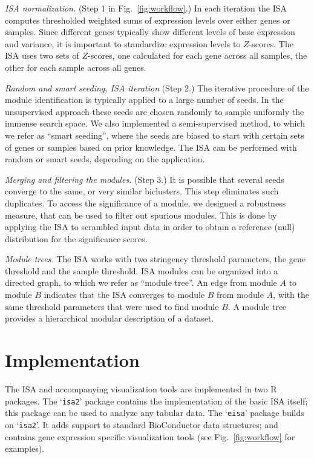 \documentclass{bioinfo}
\newcommand{\Rpackage}[1]{`\texttt{#1}'}
\begin{document}
\emph{ISA normalization.} (Step 1 in Fig.~\ref{fig:workflow}.)
In each iteration the ISA computes thresholded weighted sums of expression
levels over either genes or samples. Since different genes 
typically show different levels of base
expression and variance, it is important to standardize expression
levels to $Z$-scores. The ISA uses two sets of $Z$-scores, one
calculated for each gene across all samples, the other for each sample
across all genes.

\emph{Random and smart seeding, ISA iteration} (Step 2.)
The iterative procedure of the module identification is typically applied to a
large number of seeds. In the unsupervised approach these seeds are chosen
randomly to sample uniformly the immense search space. We also implemented a
semi-supervised method, to which we refer as ``smart seeding'', where the
seeds are biased to start with certain sets of genes or samples based on
prior knowledge. The ISA can be performed with random or smart
seeds, depending on the application.

\emph{Merging and filtering the modules.} (Step 3.)
It is possible that several seeds converge to the same, or very similar
biclusters. This step eliminates such duplicates.
To access the significance of a module, we designed a robustness
measure, that can be used to filter out spurious modules. This is done
by applying the ISA to scrambled input data in order to obtain a
reference (null) distribution for the significance scores.

\emph{Module trees.}
The ISA works with two stringency threshold parameters, the gene
threshold and the sample threshold. ISA modules can be organized into
a directed graph, to which we refer as ``module tree''. An edge from module
$A$ to module $B$ indicates that the ISA converges to module $B$ from module $A$,
with the same threshold parameters that were used to find module
$B$. A module tree provides a hierarchical modular description of a
dataset.

\section{Implementation}%
\label{sec:implementation}

The ISA and accompanying visualization tools are implemented in two R
packages. The \Rpackage{isa2} package contains the implementation of
the basic ISA itself; this package can be used to analyze any tabular
data. The \Rpackage{eisa} package builds on \Rpackage{isa2}. It adds
support to standard BioConductor data structures; and
contains gene expression specific visualization tools (see
Fig.~\ref{fig:workflow} for examples).
\end{document}
